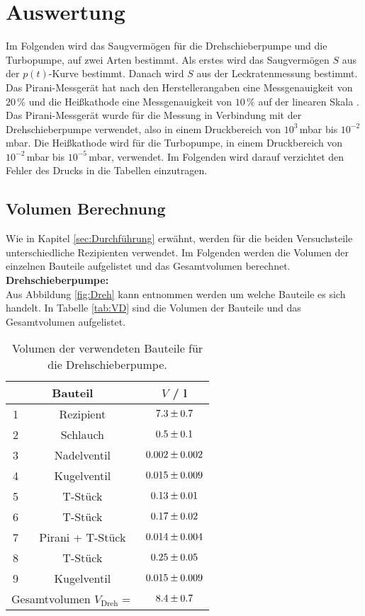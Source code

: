 \section{Auswertung}
\label{sec:Auswertung}
Im Folgenden wird das Saugvermögen für die Drehschieberpumpe und die Turbopumpe, auf zwei Arten bestimmt. Als erstes wird das Saugvermögen $S$ aus der $p(t)$-Kurve bestimmt. Danach wird $S$ aus der Leckratenmessung bestimmt. \\
Das Pirani-Messgerät hat nach den Herstellerangaben eine Messgenauigkeit von $20\,\%$ und die Heißkathode eine Messgenauigkeit von $10\,\%$ auf der linearen Skala \cite{V70}. Das Pirani-Messgerät wurde für die Messung in Verbindung mit der Drehschieberpumpe verwendet, also in einem Druckbereich von $10^{3}$\,mbar bis $10^{-2}$\,mbar. Die Heißkathode wird für die Turbopumpe, in einem Druckbereich von $10^{-2}$\,mbar bis $10^{-5}$\,mbar, verwendet. Im Folgenden wird darauf verzichtet den Fehler des Drucks in die Tabellen einzutragen. \\



\subsection{Volumen Berechnung}
Wie in Kapitel \eqref{sec:Durchführung} erwähnt, werden für die beiden Versuchsteile unterschiedliche Rezipienten verwendet. Im Folgenden werden die Volumen der einzelnen Bauteile aufgelistet und das Gesamtvolumen berechnet. \\
\textbf{Drehschieberpumpe:} \\
Aus Abbildung \eqref{fig:Dreh} kann entnommen werden um welche Bauteile es sich handelt. In Tabelle \eqref{tab:VD} sind die Volumen der Bauteile und das Gesamtvolumen aufgelistet.

\begin{table}[H] %
  \centering
  \caption{Volumen der verwendeten Bauteile für die Drehschieberpumpe.}
  \label{tab:VD}
  \begin{tabular}{c|c|c}
    \multicolumn{2}{c|}{Bauteil} & $V$ / l \\
    \midrule
    1 & Rezipient & $\num{7.3 +- 0.7}$ \\
    2 & Schlauch & $\num{0.5 +- 0.1}$ \\
    3 & Nadelventil & $\num{0.002 +- 0.002}$ \\
    4 & Kugelventil & $\num{0.015 +- 0.009}$ \\
    5 & T-Stück & $\num{0.13 +- 0.01}$ \\
    6 & T-Stück & $\num{0.17 +- 0.02}$ \\
    7 & Pirani + T-Stück & $\num{0.014 +- 0.004}$ \\
    8 & T-Stück & $\num{0.25 +- 0.05}$ \\
    9 & Kugelventil & $\num{0.015 +- 0.009}$ \\
    \midrule
    \multicolumn{2}{c}{Gesamtvolumen $V_\text{Dreh} =$} & $\num{8.4 +- 0.7}$ \\
  \end{tabular}
\end{table}

